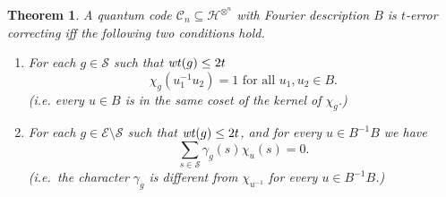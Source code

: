 \documentclass{Rinton-P9x6}
\newtheorem{theorem}{Theorem}[section]
\newcommand{\wt}{{\it wt}}
\newcommand{\C}{{\ensuremath{\mathcal{C}}}}
\renewcommand{\S}{{\ensuremath{\mathcal{S}}}}
\newcommand{\Hin}{{\ensuremath{\mathcal{H}^{\otimes^n}}}}
\newcommand{\E}{{\ensuremath{\mathcal{E}}}}
\begin{document}
\begin{theorem}{\label{distdtheorem}}
  A quantum code $\C_n\subseteq\Hin$ with Fourier description $B$ is
  $t$-error correcting iff the following two conditions hold.
  
\begin{enumerate}
  
\item 
For each $g \in \S$ such that $\wt(g)\leq 2t$
\[
\chi_g( u_1^{-1} u_2) = 1 \textrm{ for all } u_1,u_2 \in B. 
\]
(i.e. every $u \in B$ is in the same coset of the kernel of $\chi_g$.)

\item 
For each $g \in \E \setminus \S$ such that $\wt(g)\leq 2t$, and for 
every $u \in B^{-1} B$ we have
\[
\sum_{s \in \S} \gamma_g(s)\chi_u(s) = 0.
\]
(i.e.\ the character $\gamma_g$ is different from $\chi_{u^{-1}}$ for every
$u\in B^{-1} B$.)

\end{enumerate}
\end{theorem}
\end{document}
